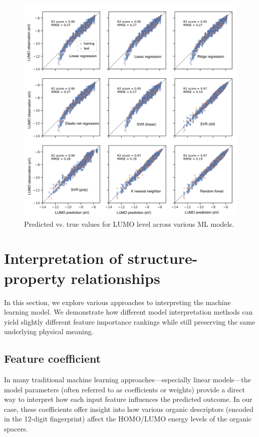 \begin{figure}[htbp]
    \centering
    \includegraphics[width=\textwidth]{figures/HT-ML/figure4-14.png}
    \caption{Predicted vs. true values for LUMO level across various ML models.}
    \label{fig:figure4.14}
\end{figure}

\section{Interpretation of structure-property relationships}\label{section:section4-4}

In this section, we explore various approaches to interpreting the machine learning model. We demonstrate how different model interpretation methods can yield slightly different feature importance rankings while still preserving the same underlying physical meaning.

\subsection{Feature coefficient}

In many traditional machine learning approaches—especially linear models—the model parameters (often referred to as coefficients or weights) provide a direct way to interpret how each input feature influences the predicted outcome. In our case, these coefficients offer insight into how various organic descriptors (encoded in the 12-digit fingerprint) affect the HOMO/LUMO energy levels of the organic spacers.

